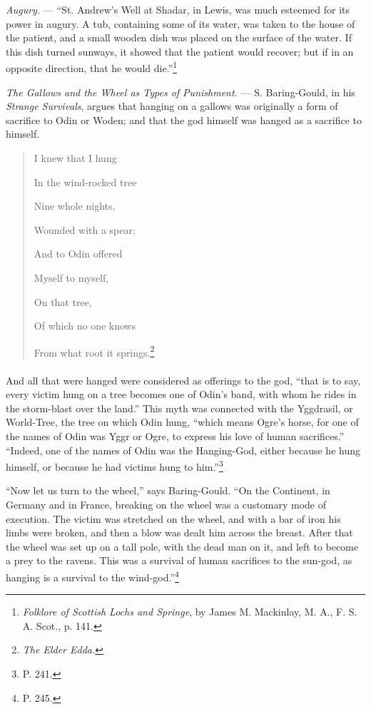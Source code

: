 \documentclass[a4paper, 11pt, oneside, polutonikogreek, english]{article}
\begin{document}
\emph{Augury.} --- ``St. Andrew's Well at Shadar, in Lewis, was much esteemed for its power in augury. A tub, containing some of its water, was taken to the house of the patient, and a small wooden dish was placed on the surface of the water. If this dish turned sunways, it showed that the patient would recover; but if in an opposite direction, that he would die.''\footnote{\emph{Folklore of Scottish Lochs and Springe}, by James M. Mackinlay, M. A., F. S. A. Scot., p. 141.}

\emph{The Gallows and the Wheel as Types of Punishment.} --- S. Baring-Gould, in his \emph{Strange Survivals}, argues that hanging on a gallows was originally a form of sacrifice to Odin or Woden; and that the god himself was hanged as a sacrifice to himself.

\begin{quotation}\small
I knew that I hung

In the wind-rocked tree

Nine whole nights,

Wounded with a spear;

And to Odin offered

Myself to myself,

On that tree,

Of which no one knows

From what root it springs.\footnote{\emph{The Elder Edda.}}
\end{quotation}
\paragraph{}
And all that were hanged were considered as offerings to the god, ``that is to say, every victim hung on a tree becomes one of Odin's band, with whom he rides in the storm-blast over the land.'' This myth was connected with the Yggdrasil, or World-Tree, the tree on which Odin hung, ``which means Ogre's horse, for one of the names of Odin was Yggr or Ogre, to express his love of human sacrifices.'' ``Indeed, one of the names of Odin was the Hanging-God, either because he hung himself, or because he had victims hung to him.''\footnote{P. 241.}

``Now let us turn to the wheel,'' says Baring-Gould. ``On the Continent, in Germany and in France, breaking on the wheel was a customary mode of execution. The victim was stretched on the wheel, and with a bar of iron his limbs were broken, and then a blow was dealt him across the breast. After that the wheel was set up on a tall pole, with the dead man on it, and left to become a prey to the ravens. This was a survival of human sacrifices to the sun-god, as hanging is a survival to the wind-god.''\footnote{P. 245.}
\end{document}
